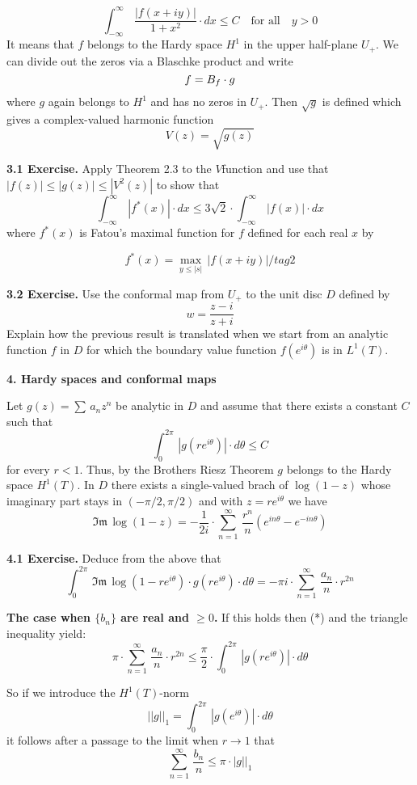 \[
\int_{-\infty}^\infty\,
\frac{|f(x+iy)|}{1+x^2}\cdot dx\leq C\quad\text{for all}\quad y>0
\] 
It means that $f$ belongs to the Hardy space $H^1$ in the upper half-plane $U_+$.
We can divide out the zeros via a Blaschke product and write
\[ 
f=B_ f\cdot g
\] 
where $g$ again belongs to $H^1$ and has no zeros in $U_+$.
Then $\sqrt{g}$ is defined which 
gives a complex-valued harmonic function
\[ 
V(z)= \sqrt{g(z)}
\]
\medskip

\noindent
{\bf{3.1 Exercise.}}
Apply Theorem 2.3 to the $V$\vvv function and use that
$|f(z)|\leq |g(z)|\leq |V^2(z)|$ to show that
\[
\int_{-\infty}^\infty\, |f^*(x)|\cdot dx\leq
3\sqrt{2}\cdot \int_{-\infty}^\infty\, |f(x)|\cdot dx\tag{1}
\] 
where $f^*(x)$ is Fatou's maximal function
for $f$ defined for each real $x$ by

\[
f^*(x)=\max_{y\leq |s|}\,|f(x+iy)|/tag{2}
\]
\medskip

\noindent
{\bf{3.2 Exercise.}}
Use the conformal map from $U_+$ to the unit disc $D$
defined by
\[
w=\frac{z-i}{z+i}
\]
Explain how the previous result is translated when we start from an
analytic function $f$ in $D$ for which the boundary value function $f(e^{i\theta})$
is in $L^1(T)$.

\newpage

\centerline{\bf{4. Hardy spaces and conformal maps}}


\medskip

\noindent
Let $g(z)=\sum\, a_nz^n$ be analytic in $D$ and assume that 
there exists a constant $C$ such that
\[ 
\int_0^{2\pi}\, |g(re^{i\theta})|\cdot d\theta\leq C
\] 
for every $r<1$.
Thus, by the Brothers Riesz Theorem 
$g$ belongs to the Hardy space $H^1(T)$.
In $D$ there exists a single-valued brach of
$\log(1-z)$ whose imaginary part stays in $(-\pi/2,\pi/2)$ and
with $z=re^{i\theta}$ we  have
\[ 
\mathfrak{Im}\, \log(1-z)=
-\frac{1}{2i}\cdot \sum_{n=1}^\infty\, \frac{r^n}{n}(e^{in\theta}-e^{-in\theta})
\]


\noindent
{\bf{4.1 Exercise.}}
Deduce from the above that
\[
\int_0^{2\pi}\, \mathfrak{Im}\,\log(1-re^{i\theta})\cdot
g(re^{i\theta})\cdot d\theta=
-\pi i\cdot \sum_{n=1}
^\infty\, \frac{a_n}{n}\cdot r^{2n}\tag{*}
\]
\medskip

\noindent
{\bf{The case when $\{b_n\}$ are real and $\geq 0$.}}
If this holds then (*) and the triangle inequality yield:
\[
\pi\cdot  \sum_{n=1}
^\infty\, \frac{a_n}{n}\cdot r^{2n}\leq \frac{\pi}{2}\cdot
\int_0^{2\pi}\, |g(re^{i\theta})|\cdot d\theta
\] 

\noindent
So if we introduce the $H^1(T)$-norm
\[
||g||_1= \int_0^{2\pi}\, |g(e^{i\theta})|\cdot d\theta
\] 
it follows after a passage to the limit when $r\to 1$ that
\[
\sum_{n=1}^\infty\, \frac{b_n}{n}\leq \pi\cdot |g||_1\tag{**}
\]
\medskip

